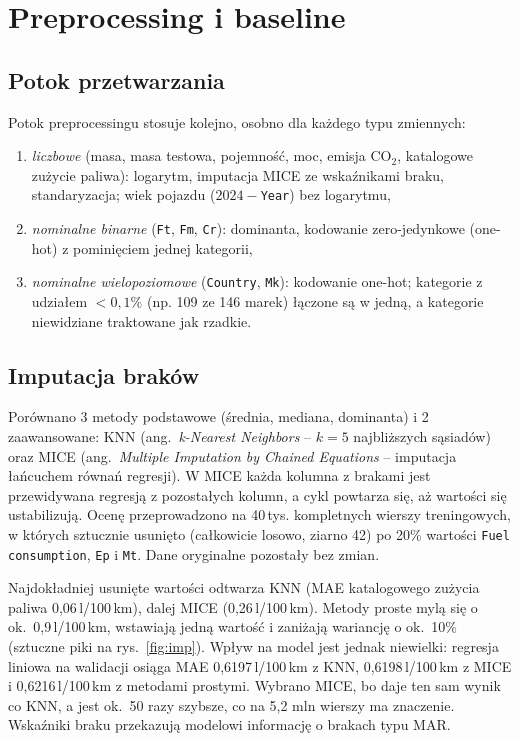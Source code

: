 \documentclass[10pt,twocolumn,a4paper]{article}
\newcommand{\lkm}{\,l/100\,km}
\begin{document}
\section{Preprocessing i baseline}\label{sec:prep}
\subsection{Potok przetwarzania}
Potok preprocessingu stosuje kolejno, osobno dla każdego typu zmiennych:
\begin{enumerate}[leftmargin=*,itemsep=1pt]
\item \emph{liczbowe} (masa, masa testowa, pojemność, moc, emisja CO$_2$,
katalogowe zużycie paliwa): logarytm, imputacja MICE ze wskaźnikami braku,
standaryzacja; wiek pojazdu ($2024-$\texttt{Year}) bez logarytmu,
\item \emph{nominalne binarne} (\texttt{Ft}, \texttt{Fm}, \texttt{Cr}):
dominanta, kodowanie zero-jedynkowe (one-hot) z pominięciem jednej kategorii,
\item \emph{nominalne wielopoziomowe} (\texttt{Country}, \texttt{Mk}):
kodowanie one-hot; kategorie z udziałem $<0,1\%$ (np. 109 ze 146 marek)
łączone są w jedną, a kategorie niewidziane traktowane jak rzadkie.
\end{enumerate}

\subsection{Imputacja braków}\label{sec:imp}
Porównano 3 metody podstawowe (średnia, mediana, dominanta) i 2 zaawansowane:
KNN (ang.\ \emph{k-Nearest Neighbors} -- $k=5$ najbliższych sąsiadów) oraz
MICE (ang.\ \emph{Multiple Imputation by Chained Equations} -- imputacja
łańcuchem równań regresji). W MICE każda kolumna z brakami jest przewidywana
regresją z pozostałych kolumn, a cykl powtarza się, aż wartości się
ustabilizują. Ocenę przeprowadzono na 40\,tys. kompletnych wierszy
treningowych, w których sztucznie usunięto (całkowicie losowo, ziarno 42) po
20\% wartości \texttt{Fuel consumption}, \texttt{Ep} i \texttt{Mt}. Dane
oryginalne pozostały bez zmian.

Najdokładniej usunięte wartości odtwarza KNN (MAE katalogowego zużycia paliwa
0,06\lkm), dalej MICE (0,26\lkm). Metody proste mylą się o ok.\ 0,9\lkm,
wstawiają jedną wartość i zaniżają wariancję o ok.\ 10\% (sztuczne piki na
rys.~\ref{fig:imp}). Wpływ na model jest jednak niewielki: regresja liniowa
na walidacji osiąga MAE 0,6197\lkm{} z KNN, 0,6198\lkm{} z MICE
i 0,6216\lkm{} z metodami prostymi. Wybrano MICE, bo daje ten sam wynik co
KNN, a jest ok.\ 50 razy szybsze, co na 5,2 mln wierszy ma znaczenie.
Wskaźniki braku przekazują modelowi informację o brakach typu MAR.
\end{document}

